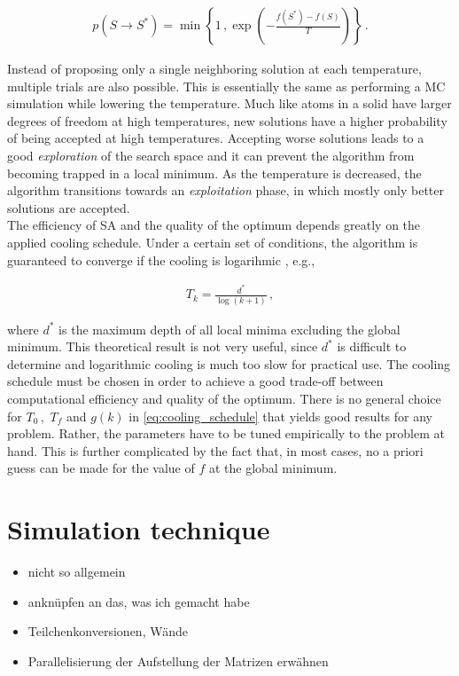 \documentclass[bachelor,       %
               oneside,        %
               BCOR10mm,       %
               ngerman, english %
               ]{GAUBM}
\begin{document}
\begin{align}
    p(S\rightarrow S^*)=\min\left\{1\,,\exp\left(-\frac{f(S^*)-f(S)}{T}\right)\right\}\,.
\end{align}

Instead of proposing only a single neighboring solution at each temperature, multiple trials are also possible. This is essentially the same as performing a \ac{MC} simulation while lowering the temperature. Much like atoms in a solid have larger degrees of freedom at high temperatures, new solutions have a higher probability of being accepted at high temperatures. Accepting worse solutions leads to a good \textit{exploration} of the search space and it can prevent the algorithm from becoming trapped in a local minimum. As the temperature is decreased, the algorithm transitions towards an \textit{exploitation} phase, in which mostly only better solutions are accepted.\\
The efficiency of \ac{SA} and the quality of the optimum depends greatly on the applied cooling schedule. Under a certain set of conditions, the algorithm is guaranteed to converge if the cooling is logarihmic \cite{hajek_sa}, e.g., 

\begin{align}
    T_k=\frac{d^*}{\log(k+1)}\,,
\end{align}

where $d^*$ is the maximum depth of all local minima excluding the global minimum. This theoretical result is not very useful, since $d^*$ is difficult to determine and logarithmic cooling is much too slow for practical use. The cooling schedule must be chosen in order to achieve a good trade-off between computational efficiency and quality of the optimum. There is no general choice for $T_0\,,$ $T_f$ and $g(k)$ in \autoref{eq:cooling_schedule} that yields good results for any problem. Rather, the parameters have to be tuned empirically to the problem at hand. This is further complicated by the fact that, in most cases, no a priori guess can be made for the value of $f$ at the global minimum.

\chapter{Simulation technique}

\begin{itemize}
    \item nicht so allgemein
    \item anknüpfen an das, was ich gemacht habe
    \item Teilchenkonversionen, Wände
    \item Parallelisierung der Aufstellung der Matrizen erwähnen
\end{itemize}
\end{document}
